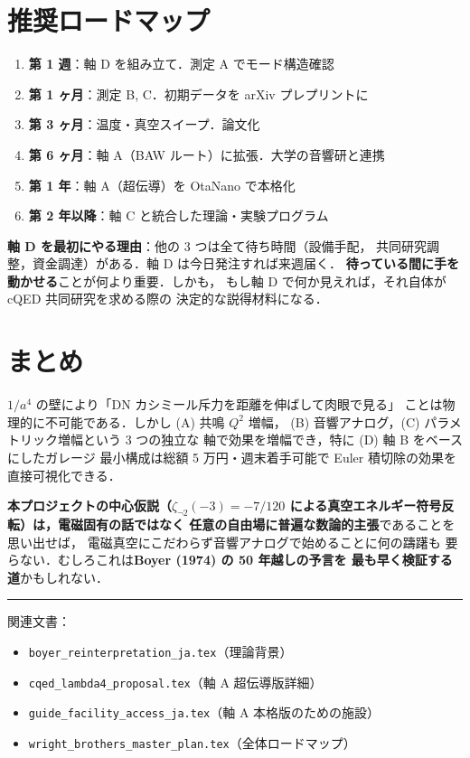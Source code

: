 \documentclass[11pt,a4paper]{article}
\begin{document}
\section{推奨ロードマップ}

\begin{enumerate}
\item \textbf{第 1 週}：軸 D を組み立て．測定 A でモード構造確認
\item \textbf{第 1 ヶ月}：測定 B, C．初期データを arXiv プレプリントに
\item \textbf{第 3 ヶ月}：温度・真空スイープ．論文化
\item \textbf{第 6 ヶ月}：軸 A（BAW ルート）に拡張．大学の音響研と連携
\item \textbf{第 1 年}：軸 A（超伝導）を OtaNano で本格化
\item \textbf{第 2 年以降}：軸 C と統合した理論・実験プログラム
\end{enumerate}

\textbf{軸 D を最初にやる理由}：他の 3 つは全て待ち時間（設備手配，
共同研究調整，資金調達）がある．軸 D は今日発注すれば来週届く．
\textbf{待っている間に手を動かせる}ことが何より重要．しかも，
もし軸 D で何か見えれば，それ自体が cQED 共同研究を求める際の
決定的な説得材料になる．

\section{まとめ}

$1/a^4$ の壁により「DN カシミール斥力を距離を伸ばして肉眼で見る」
ことは物理的に不可能である．しかし (A) 共鳴 $Q^2$ 増幅，
(B) 音響アナログ，(C) パラメトリック増幅という 3 つの独立な
軸で効果を増幅でき，特に (D) 軸 B をベースにしたガレージ
最小構成は総額 5 万円・週末着手可能で Euler 積切除の効果を
直接可視化できる．

\textbf{本プロジェクトの中心仮説（$\zeta_{\neg 2}(-3) = -7/120$
による真空エネルギー符号反転）は，電磁固有の話ではなく
任意の自由場に普遍な数論的主張}であることを思い出せば，
電磁真空にこだわらず音響アナログで始めることに何の躊躇も
要らない．むしろこれは\textbf{Boyer (1974) の 50 年越しの予言を
最も早く検証する道}かもしれない．

\vspace{1em}
\hrule
\vspace{0.5em}
\small
\noindent
関連文書：
\begin{itemize}
\item \texttt{boyer\_reinterpretation\_ja.tex}（理論背景）
\item \texttt{cqed\_lambda4\_proposal.tex}（軸 A 超伝導版詳細）
\item \texttt{guide\_facility\_access\_ja.tex}（軸 A 本格版のための施設）
\item \texttt{wright\_brothers\_master\_plan.tex}（全体ロードマップ）
\end{itemize}
\end{document}
